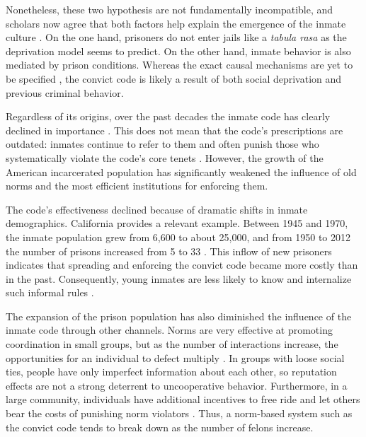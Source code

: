 \documentclass[a4paper, 12pt]{article}
\begin{document}
Nonetheless, these two hypothesis are not fundamentally incompatible, and scholars now agree that both factors help explain the emergence of the inmate culture \citep{schwartz1971pre,trammell2009values}. On the one hand, prisoners do not enter jails like a \textit{tabula rasa} as the deprivation model seems to predict. On the other hand, inmate behavior is also mediated by prison conditions. Whereas the exact causal mechanisms are yet to be specified \citep{delisi2004gang}, the convict code is likely a result of both social deprivation and previous criminal behavior. 

Regardless of its origins, over the past decades the inmate code has clearly declined in importance \citep{irwin1970felon,jacobs1975stratification,skarbek2014social}. This does not mean that the code's prescriptions are outdated: inmates continue to refer to them and often punish those who systematically violate the code's core tenets  \citep{copes2013accounting,trammell2012enforcing}. However, the growth of the American incarcerated population has significantly weakened the influence of old norms and the most efficient institutions for enforcing them.

The code's effectiveness declined because of dramatic shifts in inmate demographics. California provides a relevant example. Between 1945 and 1970, the inmate population grew from 6,600 to about 25,000, and from 1950 to 2012 the number of prisons increased from 5 to 33 \citep{bass1975analysis,skarbek2014social}. This inflow of new prisoners indicates that spreading and enforcing the convict code became more costly than in the past. Consequently, young inmates are less likely to know and internalize such informal rules \citep{hunt1993change}. 

The expansion of the prison population has also diminished the influence of the inmate code through other channels. Norms are very effective at promoting coordination in small groups, but as the number of interactions increase, the opportunities for an individual to defect multiply \citep{bowles1998moral}. In groups with loose social ties, people have only imperfect information about each other, so reputation effects are not a strong deterrent to uncooperative behavior. Furthermore, in a large community, individuals have additional incentives to free ride and let others bear the costs of punishing norm violators \citep{olson1965logic}. Thus, a norm-based system such as the convict code tends to break down as the number of felons increase. 
\end{document}
